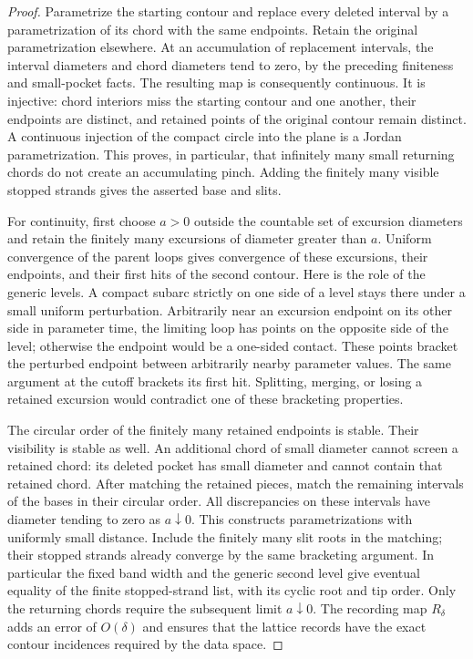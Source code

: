 \begin{proof}
Parametrize the starting contour and replace every deleted interval
by a parametrization of its chord with the same endpoints.  Retain
the original parametrization elsewhere.  At an accumulation of
replacement intervals, the interval diameters and chord diameters
tend to zero, by the preceding finiteness and small-pocket facts.
The resulting map is consequently continuous.  It is injective:
chord interiors miss the starting contour and one another, their
endpoints are distinct, and retained points of the original contour
remain distinct.  A continuous injection of the compact circle into
the plane is a Jordan parametrization.  This proves, in particular,
that infinitely many small returning chords do not create an
accumulating pinch.  Adding the finitely many visible stopped strands
gives the asserted base and slits.

For continuity, first choose $a>0$ outside the countable set of excursion
diameters and retain the finitely many excursions of diameter greater
than $a$. Uniform convergence of the parent loops
gives convergence of these excursions, their endpoints, and their
first hits of the second contour.  Here is the role of the generic
levels.  A compact subarc strictly on one side of a level stays there
under a small uniform perturbation. Arbitrarily near an excursion
endpoint on its other side in parameter time, the limiting loop has
points on the opposite side of the level; otherwise the endpoint
would be a one-sided contact. These points bracket the perturbed endpoint
between arbitrarily nearby parameter values.  The same argument at
the cutoff brackets its first hit.  Splitting, merging, or losing a
retained excursion would contradict one of these bracketing
properties.

The circular order of the finitely many retained endpoints is stable.
Their visibility is stable as well.  An additional chord of small
diameter cannot screen a retained chord: its deleted pocket has small
diameter and cannot contain that retained chord.  After matching the
retained pieces, match the remaining intervals of the bases in their
circular order.  All discrepancies on these intervals have diameter
tending to zero as $a\downarrow0$.  This constructs parametrizations
with uniformly small distance.  Include the finitely many slit roots
in the matching; their stopped strands already converge by the same
bracketing argument. In particular the fixed band width and the generic
second level give eventual equality of the finite stopped-strand list,
with its cyclic root and tip order. Only the returning chords require
the subsequent limit $a\downarrow0$. The recording map $R_\delta$ adds
an error of $O(\delta)$ and ensures that the lattice records have the
exact contour incidences required by the data space.


\end{proof}
